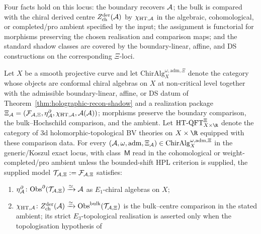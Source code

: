 Four facts hold on this locus: the boundary recovers $\mathcal{A}$; the bulk
is compared with the chiral derived centre
$Z^{\mathrm{der}}_{\mathrm{ch}}(\mathcal{A})$ by
\(\chi_{\mathrm{HT},\mathcal{A}}\) in the algebraic, cohomological, or
completed/pro ambient specified by the input; the assignment is
functorial for morphisms preserving the chosen realisation and
comparison maps; and the standard shadow classes are covered by the
boundary-linear, affine, and DS constructions on the corresponding
\(\Xi\)-loci.

\begin{theorem}%
\label{thm:holographic-recon-class-m}%
%
%
%
Let $X$ be a smooth projective curve and let
$\mathrm{ChirAlg}^{\omega,\mathrm{adm},\Xi}_X$ denote the category whose
objects are conformal chiral algebras on $X$ at non-critical level
together with the admissible boundary-linear, affine, or DS datum of
Theorem~\ref{thm:holographic-recon-shadow} and a realization package
\(\Xi_{\mathcal{A}}=(\mathcal F_{\mathcal{A},\Xi},\eta^\partial_{\mathcal{A}},
\chi_{\mathrm{HT},\mathcal{A}},\mathcal A(\mathcal{A}))\); morphisms preserve the
boundary comparison, the bulk--Hochschild comparison, and the ambient.
Let $\mathrm{HT\text{-}QFT}^{\Xi}_{X\times\R}$ denote the category of
$3$d holomorphic-topological BV theories on $X\times\R$ equipped with
these comparison data. For every
$(\mathcal{A},\omega,\mathrm{adm},\Xi_{\mathcal{A}})\in
\mathrm{ChirAlg}^{\omega,\mathrm{adm},\Xi}_X$ in the generic/Koszul
exact locus, with class~$\mathsf M$ read in the cohomological or
weight-completed/pro ambient unless the bounded-shift HPL criterion is
supplied, the supplied model
$\mathcal{T}_{\mathcal{A},\Xi}:=\mathcal F_{\mathcal{A},\Xi}$ satisfies:
\begin{enumerate}[label=\textup{(\roman*)}]
\item\label{item:uh-boundary}
 $\eta^\partial_{\mathcal{A}}\colon
 \mathrm{Obs}^{\partial}(\mathcal{T}_{\mathcal{A},\Xi})\xrightarrow{\simeq}\mathcal{A}$
 as
 $E_1$-chiral algebras on $X$;
\item\label{item:uh-bulk}
	 $\chi_{\mathrm{HT},\mathcal{A}}\colon
	 Z^{\mathrm{der}}_{\mathrm{ch}}(\mathcal{A})\xrightarrow{\simeq}
	 \mathrm{Obs}^{\mathrm{bulk}}(\mathcal{T}_{\mathcal{A},\Xi})$
	 is the bulk--centre comparison in the stated ambient; its strict
	 $E_3$-topological realisation is asserted only when the
	 topologisation hypothesis of

\end{enumerate}
\end{theorem}
